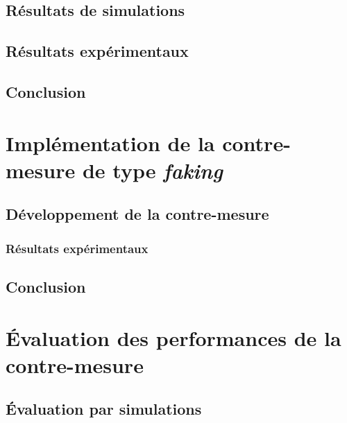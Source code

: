 \documentclass[oneside]{book}
\begin{document}
\section{Résultats de simulations}
\label{sec:Introduction}

\section{Résultats expérimentaux}
\label{sec:Introduction}

\section{Conclusion}
\label{sec:Introduction}

\newpage


\chapter{Implémentation de la contre-mesure de type \textit{faking}}

\section{Développement de la contre-mesure}
\label{sec:Introduction}

\subsection{Résultats expérimentaux}
\label{sec:Introduction}

\section{Conclusion}
\label{sec:Introduction}

\newpage


\chapter{Évaluation des performances de la contre-mesure}

\section{Évaluation par simulations}
\label{sec:Introduction}
\end{document}

